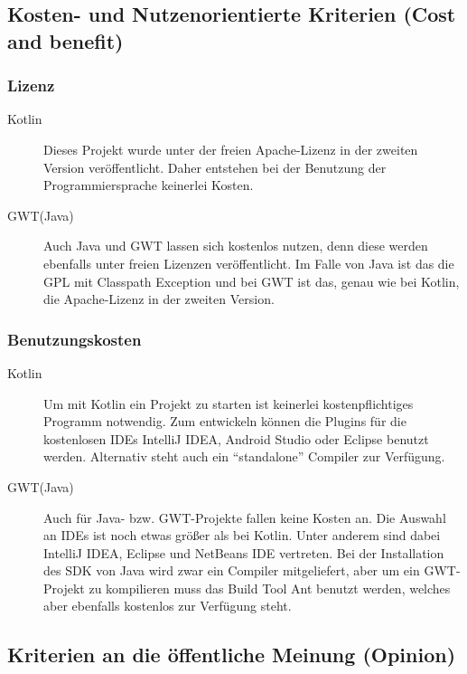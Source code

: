 \subsection{Kosten- und Nutzenorientierte Kriterien (Cost and benefit)}
\subsubsection{Lizenz}
\begin{description}
	\item[Kotlin] Dieses Projekt wurde unter der freien Apache-Lizenz in der zweiten Version veröffentlicht. Daher entstehen bei der Benutzung der Programmiersprache keinerlei Kosten. \cite{kotlinFree}
	\item[GWT(Java)] Auch Java und \gls{GWT} lassen sich kostenlos nutzen, denn diese werden ebenfalls unter freien Lizenzen veröffentlicht. Im Falle von Java ist das die \gls{GPL} mit Classpath Exception und bei \gls{GWT} ist das, genau wie bei Kotlin, die Apache-Lizenz in der zweiten Version. \cite{javaLicense, gwtTerms}
\end{description}

\subsubsection{Benutzungskosten}
\begin{description}
	\item[Kotlin] Um mit Kotlin ein Projekt zu starten ist keinerlei kostenpflichtiges Programm notwendig. Zum entwickeln können die Plugins für die kostenlosen \glspl{IDE} IntelliJ IDEA, Android Studio oder Eclipse benutzt werden. Alternativ steht auch ein \enquote{standalone} Compiler zur Verfügung.
	\item[GWT(Java)] Auch für Java- bzw. \gls{GWT}-Projekte fallen keine Kosten an. Die Auswahl an \glspl{IDE} ist noch etwas größer als bei Kotlin. Unter anderem sind dabei IntelliJ IDEA, Eclipse und NetBeans IDE vertreten. Bei der Installation des \gls{SDK} von Java wird zwar ein Compiler mitgeliefert, aber um ein \gls{GWT}-Projekt zu kompilieren muss das Build Tool Ant benutzt werden, welches aber ebenfalls kostenlos zur Verfügung steht.
\end{description}


\subsection{Kriterien an die öffentliche Meinung (Opinion)}
